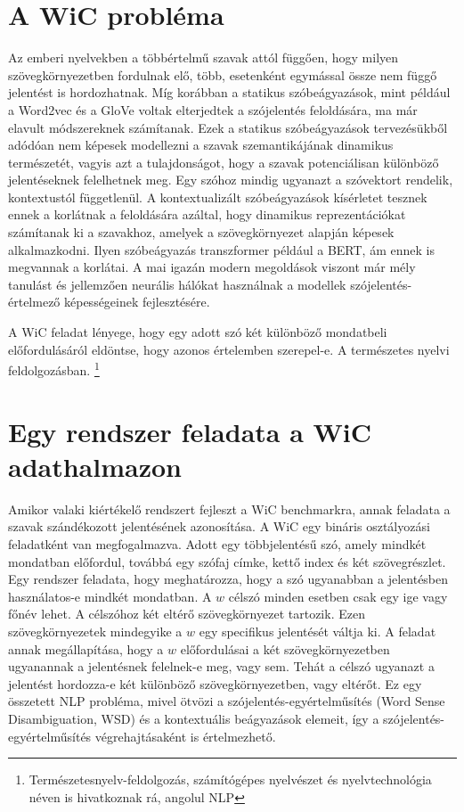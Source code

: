 \documentclass[12pt]{report}
\theoremstyle{definition}
\begin{document}
\section{A WiC probléma}
Az emberi nyelvekben a többértelmű szavak attól függően, hogy milyen szövegkörnyezetben fordulnak elő, több, esetenként egymással össze nem függő jelentést is hordozhatnak. Míg korábban a statikus szóbeágyazások, mint például a Word2vec és a GloVe voltak elterjedtek a szójelentés feloldására, ma már elavult módszereknek számítanak. Ezek a statikus szóbeágyazások tervezésükből adódóan nem képesek modellezni a szavak szemantikájának dinamikus természetét, vagyis azt a tulajdonságot, hogy a szavak potenciálisan különböző jelentéseknek felelhetnek meg. Egy szóhoz mindig ugyanazt a szóvektort rendelik, kontextustól függetlenül. A kontextualizált szóbeágyazások kísérletet tesznek ennek a korlátnak a feloldására azáltal, hogy dinamikus reprezentációkat számítanak ki a szavakhoz, amelyek a szövegkörnyezet alapján képesek alkalmazkodni. Ilyen szóbeágyazás transzformer például a BERT, ám ennek is megvannak a korlátai. A mai igazán modern megoldások viszont már mély tanulást és jellemzően neurális hálókat használnak a modellek szójelentés-értelmező képességeinek fejlesztésére.

A WiC feladat lényege, hogy egy adott szó két különböző mondatbeli előfordulásáról eldöntse, hogy azonos értelemben szerepel-e. A természetes nyelvi feldolgozásban.
\footnote[1]{Természetesnyelv-feldolgozás, számítógépes nyelvészet és nyelvtechnológia néven is hivatkoznak rá, angolul NLP}


\section{Egy rendszer feladata a WiC adathalmazon}
Amikor valaki kiértékelő rendszert fejleszt a WiC benchmarkra, annak feladata a szavak szándékozott jelentésének azonosítása. A WiC egy bináris osztályozási feladatként van megfogalmazva. Adott egy többjelentésű szó, amely mindkét mondatban előfordul, továbbá egy szófaj címke, kettő index és két szövegrészlet. Egy rendszer feladata, hogy meghatározza, hogy a szó ugyanabban a jelentésben használatos-e mindkét mondatban. A $w$ célszó minden esetben csak egy ige vagy főnév lehet. A célszóhoz két eltérő szövegkörnyezet tartozik. Ezen szövegkörnyezetek mindegyike a $w$ egy specifikus jelentését váltja ki. A feladat annak megállapítása, hogy a $w$ előfordulásai a két szövegkörnyezetben ugyanannak a jelentésnek felelnek-e meg, vagy sem. Tehát a célszó ugyanazt a jelentést hordozza-e két különböző szövegkörnyezetben, vagy eltérőt. Ez egy összetett NLP probléma, mivel ötvözi a szójelentés-egyértelműsítés (Word Sense Disambiguation, WSD) és a kontextuális beágyazások elemeit, így a szójelentés-egyértelműsítés végrehajtásaként is értelmezhető.
\end{document}
